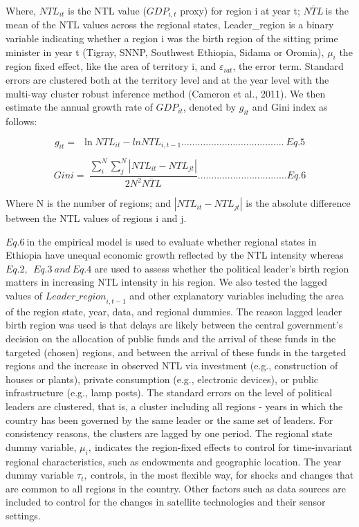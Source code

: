 Where, \({NTL}_{it}\) is the NTL value (\({GDP}_{i,t}\) proxy) for
region i at year t; \(\overline{NTL}\ \)is the mean of the NTL values
across the regional states, Leader\_region is a binary variable
indicating whether a region i was the birth region of the sitting prime
minister in year t (Tigray, SNNP, Southwest Ethiopia, Sidama or Oromia),
\(\mu_{i}\) the region fixed effect, like the area of territory i, and
\(\varepsilon_{iat}\), the error term. Standard errors are clustered
both at the territory level and at the year level with the multi-way
cluster robust inference method (Cameron et al., 2011). We then estimate
the annual growth rate of \({GDP}_{it}\), denoted by \(g_{it}\) and Gini
index as follows:

\[g_{it} = \ \ \ln{NTL}_{it} - {lnNTL}_{i,t - 1}\ldots\ldots\ldots\ldots\ldots\ldots\ldots\ldots\ldots\ldots\ldots\ldots..\ Eq.5\]

\[Gini = \ \frac{\sum_{i}^{N}{\sum_{j}^{N}{|{NTL}_{it} - {NTL}_{jt}|}}}{2N^{2}\overline{NTL}}\ldots\ldots\ldots\ldots\ldots\ldots\ldots\ldots\ldots\ldots\ldots Eq.6\]

Where N is the number of regions; and \(|{NTL}_{it} - {NTL}_{jt}|\) is
the absolute difference between the NTL values of regions i and j.

\(Eq.6\ \)in the empirical model is used to evaluate whether regional
states in Ethiopia have unequal economic growth reflected by the NTL
intensity whereas \(Eq.2,\ \ Eq.3\ and\ Eq.4\) are used to assess
whether the political leader's birth region matters in increasing NTL
intensity in his region. We also tested the lagged values of
\({Leader\_ region}_{i,t - 1}\) and other explanatory variables
including the area of the region state, year, data, and regional
dummies. The reason lagged leader birth region was used is that delays
are likely between the central government's decision on the allocation
of public funds and the arrival of these funds in the targeted (chosen)
regions, and between the arrival of these funds in the targeted regions
and the increase in observed NTL via investment (e.g., construction of
houses or plants), private consumption (e.g., electronic devices), or
public infrastructure (e.g., lamp posts). The standard errors on the
level of political leaders are clustered, that is, a cluster including
all regions - years in which the country has been governed by the same
leader or the same set of leaders. For consistency reasons, the clusters
are lagged by one period. The regional state dummy variable,
\(\mu_{i},\ \)indicates the region-fixed effects to control for
time-invariant regional characteristics, such as endowments and
geographic location. The year dummy variable \(\tau_{t},\ \)controls, in
the most flexible way, for shocks and changes that are common to all
regions in the country. Other factors such as data sources are included
to control for the changes in satellite technologies and their sensor
settings.


